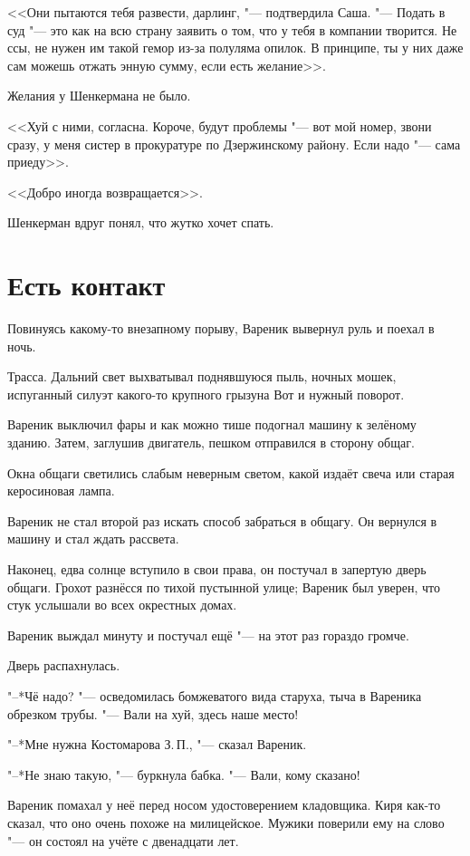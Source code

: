 <<Они пытаются тебя развести, дарлинг, "--- подтвердила Саша.
"--- Подать в суд "--- это как на всю страну заявить о том, что у тебя в компании творится.
Не ссы, не нужен им такой гемор из-за полуляма опилок.
В принципе, ты у них даже сам можешь отжать энную сумму, если есть желание>>.

Желания у Шенкермана не было.

<<Хуй с ними, согласна.
Короче, будут проблемы "--- вот мой номер, звони сразу, у меня систер в прокуратуре по Дзержинскому району.
Если надо "--- сама приеду>>.

<<Добро иногда возвращается>>.

Шенкерман вдруг понял, что жутко хочет спать.

\section{Есть контакт}

Повинуясь какому-то внезапному порыву, Вареник вывернул руль и поехал в ночь.

Трасса.
Дальний свет выхватывал поднявшуюся пыль, ночных мошек, испуганный силуэт какого-то крупного грызуна\ldotst
Вот и нужный поворот.

Вареник выключил фары и как можно тише подогнал машину к зелёному зданию.
Затем, заглушив двигатель, пешком отправился в сторону общаг.

Окна общаги светились слабым неверным светом, какой издаёт свеча или старая керосиновая лампа.

Вареник не стал второй раз искать способ забраться в общагу.
Он вернулся в машину и стал ждать рассвета.

Наконец, едва солнце вступило в свои права, он постучал в запертую дверь общаги.
Грохот разнёсся по тихой пустынной улице;
Вареник был уверен, что стук услышали во всех окрестных домах.

Вареник выждал минуту и постучал ещё "--- на этот раз гораздо громче.

Дверь распахнулась.

"--*Чё надо? "--- осведомилась бомжеватого вида старуха, тыча в Вареника обрезком трубы.
"--- Вали на хуй, здесь наше место!

"--*Мне нужна Костомарова З.\,П., "--- сказал Вареник.

"--*Не знаю такую, "--- буркнула бабка.
"--- Вали, кому сказано!

Вареник помахал у неё перед носом удостоверением кладовщика.
Киря как-то сказал, что оно очень похоже на милицейское.
Мужики поверили ему на слово "--- он состоял на учёте с двенадцати лет.

